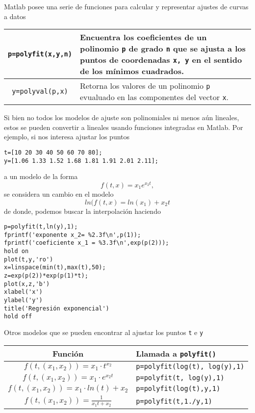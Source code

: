 \documentclass[12pt,letterpaper]{article}
\begin{document}
Matlab posee una serie de funciones para calcular y representar ajustes de curvas a datos
\begin{longtable}{||c|p{}||}
\hline
\texttt{p=polyfit(x,y,n)} 
	& Encuentra los coeficientes de un polinomio \texttt{p} de grado \texttt{n} que se ajusta a los puntos de coordenadas \texttt{x, y} en el sentido de los m\'inimos cuadrados.
\\
\hline
\texttt{y=polyval(p,x)} 
	& Retorna los valores de un polinomio \texttt{p} evualuado en las componentes del vector \texttt{x}.\\
\hline
\end{longtable}

Si bien no todos los modelos de ajuste son polinomiales ni menos a\'un lineales, estos se pueden convertir a lineales usando funciones integradas en Matlab. Por ejemplo, si nos interesa ajustar los puntos 
\begin{verbatim}
t=[10 20 30 40 50 60 70 80];
y=[1.06 1.33 1.52 1.68 1.81 1.91 2.01 2.11];
\end{verbatim}
a un modelo de la forma 
$$
f(t,x)=x_1e^{x_2 t},
$$
se considera un cambio en el modelo
$$
ln(f(t,x)= ln(x_1)+ x_2t
$$
de donde, podemos buscar la interpolaci\'on haciendo
\begin{verbatim}
p=polyfit(t,ln(y),1);
fprintf('exponente x_2= %2.3f\n',p(1));
fprintf('coeficiente x_1 = %3.3f\n',exp(p(2)));
hold on
plot(t,y,'ro')
x=linspace(min(t),max(t),50);
z=exp(p(2))*exp(p(1)*t);
plot(x,z,'b')
xlabel('x')
ylabel('y')
title('Regresión exponencial')
hold off
\end{verbatim}

Otros modelos que se pueden encontrar al ajustar los puntos \texttt{t} e \texttt{y}
\begin{center}
	\begin{tabular}{||c|l||}
    \hline
    Función				& Llamada a \texttt{polyfit()} \\
\hline
    $f(t,(x_1,x_2))=x_1\cdot t^{x_2}$		& \texttt{p=polyfit(log(t), log(y),1)}\\
 \hline
	$f(t,(x_1,x_2))=x_1\cdot e^{x_2t}$		& \texttt{p=polyfit(t, log(y),1)}\\
\hline    
    $f(t,(x_1,x_2))=x_1 \cdot ln(t)+x_2$	& \texttt{p=polyfit(log(t),y,1)} \\
\hline
    $f(t,(x_1,x_2))=\frac{1}{x_1t+x_2}$		& \texttt{p=polyfit(t,1./y,1)}\\ 
    \hline
    \end{tabular}
\end{center}
\end{document}
